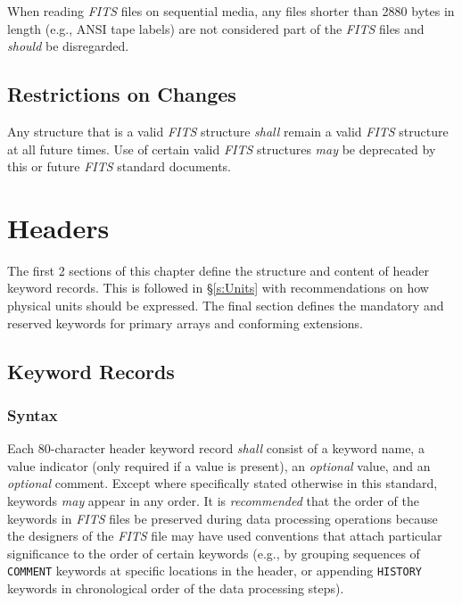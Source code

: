 \documentclass[11pt,makeidx]{book}     %
\begin{document}
When reading {\em FITS\/} files on sequential media, any files 
shorter than 2880 bytes in length (e.g., ANSI tape labels)
are not considered part of the {\em FITS\/} files and {\em should} be disregarded.

  \section{Restrictions on Changes}
  \label{s:Restrict}
   Any structure that is a valid {\em FITS\/} 
   structure {\em shall} remain 
   a valid {\em FITS\/} structure at all future times. 
   Use of certain 
   valid {\em FITS\/} structures {\em may} be 
   deprecated by this or 
   future {\em FITS\/} standard documents.
     

\chapter{Headers}
  \label{s:head}
  
 The first 2 sections of this chapter define the structure and content of header 
 keyword records.  This is followed in \S\ref{s:Units} with recommendations
 on how physical units should be expressed.  The final section defines the
 mandatory and reserved keywords for primary arrays and conforming extensions.
  
  \section{Keyword Records}
  
   \subsection{Syntax}
   Each 80-character header keyword record
   {\em shall} consist of a keyword name, a value indicator 
   (only required if a value
   is present), an {\em optional} value, and an {\em optional} comment.  Except
   where specifically stated otherwise
   in this standard, keywords {\em may} appear in any order.
   It is {\em recommended} that the order of the keywords in 
   {\em FITS\/} files be preserved during data processing operations 
   because the designers of the {\em FITS\/} file may have used conventions 
   that attach particular significance to the order of certain keywords
   (e.g., by grouping sequences of {\tt COMMENT} keywords
   at specific locations in the header, or appending {\tt HISTORY} 
   keywords in chronological order of the data processing steps).
\end{document}
